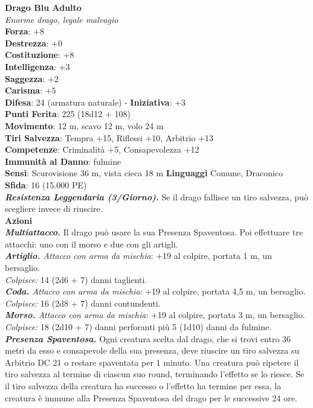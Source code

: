 \begin{multicols}{2}
\medskip\textbf{Drago Blu Adulto}\\
\emph{Enorme drago, legale malvagio}\\
\textbf{Forza}: +8\\
\textbf{Destrezza}: +0\\
\textbf{Costituzione}: +8\\
\textbf{Intelligenza}: +3\\
\textbf{Saggezza}: +2\\
\textbf{Carisma}: +5\\
\textbf{Difesa}: 24 (armatura naturale) - \textbf{Iniziativa}: +3\\
\textbf{Punti Ferita}: 225 (18d12 + 108)\\
\textbf{Movimento}: 12 m, scavo 12 m, volo 24 m\\
\textbf{Tiri Salvezza}: Tempra +15, Riflessi +10, Arbitrio +13\\
\textbf{Competenze}: Criminalità +5, Consapevolezza +12\\
\textbf{Immunità al Danno}: fulmine\\
\textbf{Sensi}: Scurovisione 36 m, vista cieca 18 m
\textbf{Linguaggi} Comune, Draconico\\
\textbf{Sfida}: 16 (15.000 PE)\smallskip\\
\emph{\textbf{Resistenza Leggendaria (3/Giorno).}} Se il drago fallisce un tiro salvezza, può scegliere invece di riuscire.\\
\smallskip\textbf{Azioni}\\
\emph{\textbf{Multiattacco.}} Il drago può usare la sua Presenza Spaventosa. Poi effettuare tre attacchi: uno con il morso e due con gli artigli.\\
\emph{\textbf{Artiglio.} Attacco con arma da mischia}: +19 al colpire, portata 1 m, un bersaglio.\\
\emph{Colpisce:} 14 (2d6 + 7) danni taglienti.\\
\emph{\textbf{Coda.} Attacco con arma da mischia}: +19 al colpire, portata 4,5 m, un bersaglio.\\
\emph{Colpisce:} 16 (2d8 + 7) danni contundenti.\\
\emph{\textbf{Morso.} Attacco con arma da mischia}: +19 al colpire, portata 3 m, un bersaglio.\\
\emph{Colpisce:} 18 (2d10 + 7) danni perforanti più 5 (1d10) danni da fulmine.\\
\emph{\textbf{Presenza Spaventosa.}} Ogni creatura scelta dal drago, che si trovi entro 36 metri da esso e consapevole della sua presenza, deve riuscire un tiro salvezza su Arbitrio DC  21 o restare spaventata per 1 minuto. Una creatura può ripetere il tiro salvezza al termine di ciascun suo round, terminando l'effetto se lo riesce. Se il tiro salvezza della creatura ha successo o l'effetto ha termine per essa, la creatura è immune alla Presenza Spaventosa del drago per le successive 24 ore.\\

\end{multicols}
